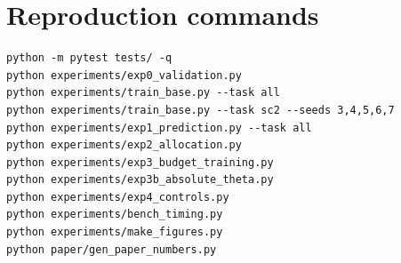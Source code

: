 \documentclass[10pt]{article}
\begin{document}
\section{Reproduction commands}
\begin{verbatim}
python -m pytest tests/ -q
python experiments/exp0_validation.py
python experiments/train_base.py --task all
python experiments/train_base.py --task sc2 --seeds 3,4,5,6,7
python experiments/exp1_prediction.py --task all
python experiments/exp2_allocation.py
python experiments/exp3_budget_training.py
python experiments/exp3b_absolute_theta.py
python experiments/exp4_controls.py
python experiments/bench_timing.py
python experiments/make_figures.py
python paper/gen_paper_numbers.py
\end{verbatim}
\end{document}
